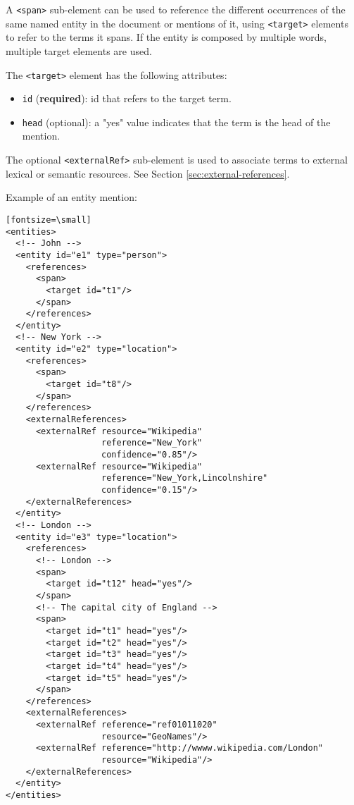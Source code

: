 A \texttt{<span>} sub-element can be used to reference the different
occurrences of the same named entity in the document or mentions of it,
using \texttt{<target>} elements to refer to the terms it spans. If the
entity is composed by multiple words, multiple target elements are used.

The \texttt{<target>} element has the following attributes:
\begin{itemize}
\item \texttt{id} (\textbf{required}): id that refers to the target term.
\item \texttt{head} (optional): a "yes" value indicates that the term is the
  head of the mention.
\end{itemize}

The optional \texttt{<externalRef>} sub-element is used to associate terms
to external lexical or semantic resources. See Section
\ref{sec:external-references}.

Example of an entity mention:

\begin{verbatim}[fontsize=\small]
<entities>
  <!-- John -->
  <entity id="e1" type="person">
    <references>
      <span>
        <target id="t1"/>
      </span>
    </references>
  </entity>
  <!-- New York -->
  <entity id="e2" type="location">
    <references>
      <span>
        <target id="t8"/>
      </span>
    </references>
    <externalReferences>
      <externalRef resource="Wikipedia"
                   reference="New_York"
                   confidence="0.85"/>
      <externalRef resource="Wikipedia"
                   reference="New_York,Lincolnshire"
                   confidence="0.15"/>
    </externalReferences>
  </entity>
  <!-- London -->
  <entity id="e3" type="location">
    <references>
      <!-- London -->
      <span>
        <target id="t12" head="yes"/>
      </span>
      <!-- The capital city of England -->
      <span>
        <target id="t1" head="yes"/>
        <target id="t2" head="yes"/>
        <target id="t3" head="yes"/>
        <target id="t4" head="yes"/>
        <target id="t5" head="yes"/>
      </span>
    </references>
    <externalReferences>
      <externalRef reference="ref01011020" 
                   resource="GeoNames"/>
      <externalRef reference="http://wwww.wikipedia.com/London" 
                   resource="Wikipedia"/>
    </externalReferences>
  </entity>
</entities>
\end{verbatim}


